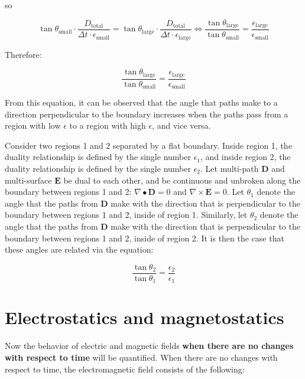 so 

\[\tan\theta_{\text{small}} \cdot \frac{D_{\text{total}}}{\Delta t \cdot \epsilon_{\text{small}}} = \tan\theta_{\text{large}} \cdot \frac{D_{\text{total}}}{\Delta t \cdot \epsilon_{\text{large}}} \iff \frac{\tan\theta_{\text{large}}}{\tan\theta_{\text{small}}} = \frac{\epsilon_{\text{large}}}{\epsilon_{\text{small}}}\]

Therefore: 

\[\frac{\tan\theta_{\text{large}}}{\tan\theta_{\text{small}}} = \frac{\epsilon_{\text{large}}}{\epsilon_{\text{small}}}\]

From this equation, it can be observed that the angle that paths make to a direction perpendicular to the boundary increases when the paths pass from a region with low \(\epsilon\) to a region with high \(\epsilon\), and vice versa. 

\begin{thm}\label{thm:path_refraction}
Consider two regions 1 and 2 separated by a flat boundary. Inside region 1, the duality relationship is defined by the single number \(\epsilon_1\), and inside region 2, the duality relationship is defined by the single number \(\epsilon_2\). Let multi-path \(\mathbf{D}\) and multi-surface \(\mathbf{E}\) be dual to each other, and be continuous and unbroken along the boundary between regions 1 and 2: \(\nabla \bullet \mathbf{D} = 0\) and \(\nabla \times \mathbf{E} = 0\). Let \(\theta_1\) denote the angle that the paths from \(\mathbf{D}\) make with the direction that is perpendicular to the boundary between regions 1 and 2, inside of region 1. Similarly, let \(\theta_2\) denote the angle that the paths from \(\mathbf{D}\) make with the direction that is perpendicular to the boundary between regions 1 and 2, inside of region 2. It is then the case that these angles are related via the equation:

\[\frac{\tan\theta_2}{\tan\theta_1} = \frac{\epsilon_2}{\epsilon_1}\]
\end{thm}



\section{Electrostatics and magnetostatics}

Now the behavior of electric and magnetic fields {\bf when there are no changes with respect to time} will be quantified. When there are no changes with respect to time, the electromagnetic field consists of the following:

